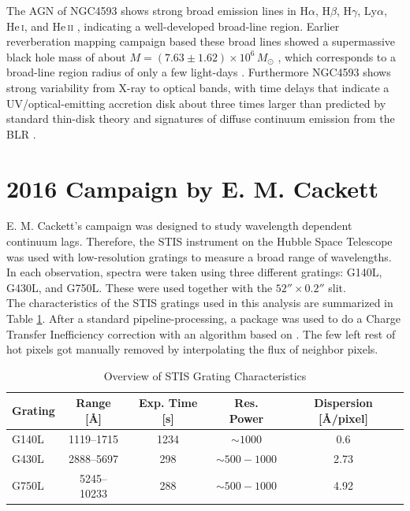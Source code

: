 \newpage
The AGN of NGC4593 shows strong broad emission lines in  H$\alpha$,  H$\beta$,  H$\gamma$, Ly$\alpha$, He\,\textsc{i}, and He\,\textsc{ii} \parencite{bentz2015agn}, indicating a well-developed broad-line region. Earlier reverberation mapping campaign based these broad lines showed a supermassive black hole mass of about $M = \left(7.63 \pm 1.62\right) \times 10^6\,M_\odot$ \parencite{bentz2015agn}, which corresponds to a broad-line region radius of only a few light-days \parencite{denney2006ngc4593}. Furthermore NGC4593 shows strong variability from X-ray to optical bands, with time delays that indicate a UV/optical-emitting accretion disk about three times larger than predicted by standard thin-disk theory and signatures of diffuse continuum emission from the BLR \parencite{cackett2018accretion}. 


\section{2016 Campaign by E. M. Cackett}
\label{Campaign_Cackett}

E. M. Cackett's campaign was designed to study wavelength dependent continuum lags. Therefore, the STIS instrument on the Hubble Space Telescope was used with low-resolution gratings to measure a broad range of wavelengths. In each observation, spectra were taken using three different gratings: G140L, G430L, and G750L. These were used together with the $52'' \times 0.2''$ slit.\\
The characteristics of the STIS gratings used in this analysis are summarized in Table \ref{tab:stis_gratings}. After a standard pipeline-processing, a package was used to do a Charge Transfer Inefficiency correction with an algorithm based on \parencite{anderson2010empirical}. The few left rest of hot pixels got manually removed by interpolating the flux of neighbor pixels.\\


\begin{table}[h!]
	\centering
	\small
	\caption{Overview of STIS Grating Characteristics \parencite{stisgratings}}
	\label{tab:stis_gratings}
	\begin{tabular}{lcccc}
		\hline
		\textbf{Grating} & \textbf{Range [\AA]} & \textbf{Exp. Time [s]} & \textbf{Res. Power} & \textbf{Dispersion [\AA/pixel]} \\
		\hline
		G140L  & 1119--1715  & 1234 & $\sim 1000$         & 0.6 \\
		G430L  & 2888--5697  & 298  & $\sim 500 - 1000$    & 2.73 \\
		G750L  & 5245--10233 & 288  & $\sim 500 - 1000$    & 4.92 \\
		\hline
	\end{tabular}
\end{table}

